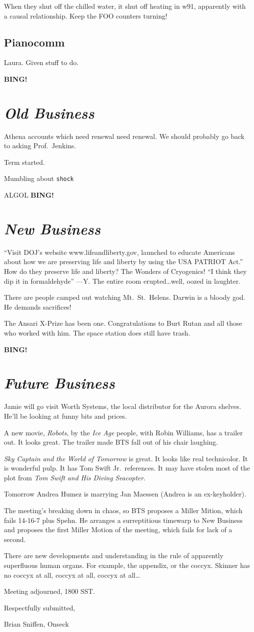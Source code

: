 \documentclass[10pt]{article}
\newcommand{\bing}{{\bf BING!} }
\newcommand{\goto}[1]{\bing \vskip 12pt \section*{{\em{#1}}}}
\newcommand{\ps}{ plus Spehn\xspace}
\begin{document}
When they shut off the chilled water, it shut off heating in w91,
apparently with a causal relationship.  Keep the FOO counters turning!

\subsection*{Pianocomm}
Laura.  Given stuff to do.

\goto{Old Business}
Athena accounts which need renewal need renewal.  We should probably
go back to asking Prof.~Jenkins.

Term started.

Mumbling about \texttt{shock}

ALGOL
\goto{New Business}

``Visit DOJ's website www.lifeandliberty.gov, launched to educate
Americans about how we are preserving life and liberty by using the
USA PATRIOT Act.''  How do they preserve life and liberty?  The
Wonders of Cryogenics!  ``I think they dip it in formaldehyde'' ---Y.
The entire room erupted\dots well, oozed in laughter.

There are people camped out watching Mt.~St.~Helens.  Darwin is a
bloody god.  He demands sacrifices!

The Ansari X-Prize has been one.  Congratulations to Burt Rutan and
all those who worked with him.  The space station does still have trash.

\goto{Future Business}

Jamie will go visit Worth Systems, the local distributor for the
Aurora shelves.  He'll be looking at funny bits and prices.

A new movie, \emph{Robots}, by the \emph{Ice Age} people, with Robin
Williams, has a trailer out.  It looks great.  The trailer made BTS
fall out of his chair laughing.

\emph{Sky Captain and the World of Tomorrow} is great.  It looks like
real technicolor.  It is wonderful pulp.  It has Tom Swift Jr.\
references.  It may have stolen most of the plot from \emph{Tom Swift
  and His Diving Seacopter}.

Tomorrow Andrea Humez is marrying Jan Maessen (Andrea is an
ex-keyholder).

The meeting's breaking down in chaos, so BTS proposes a Miller Mition,
which fails 14-16-7\ps.  He arranges a surreptitious timewarp to New
Business and proposes the first Miller Motion of the meeting, which
fails for lack of a second.

There are new developments and understanding in the rule of apparently
superfluous human organs.  For example, the appendix, or the coccyx.
Skinner has no coccyx at all, coccyx at all, coccyx at all\dots

\vspace{12pt}

\noindent
Meeting adjourned, 1800 SST.

\vspace{18pt}

\centerline{Respectfully submitted,}
\centerline{Brian Sniffen, Onseck}
\end{document}
